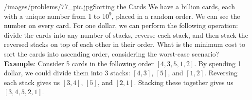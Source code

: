 \begin{problem}{/images/problems/77_pic.jpg}{Sorting the Cards} We have a billion cards, each with a unique number from 1 to $10^9$, placed in a random order. We can see the number on every card. For one dollar, we can perform the following operation: divide the cards into any number of stacks, reverse each stack, and then stack the reversed stacks on top of each other in their order. What is the minimum cost to sort the cards into ascending order, considering the worst-case scenario?\\[0.2cm]
	
\textbf{Example}: Consider 5 cards in the following order $[4,3,5,1,2]$. By spending 1 dollar, we could divide them into 3 stacks: $[4,3]$, $[5]$, and $[1,2]$. Reversing each stack gives us $[3,4]$, $[5]$, and $[2, 1]$. Stacking these together gives us  $[3,4,5,2,1]$.
\end{problem}

